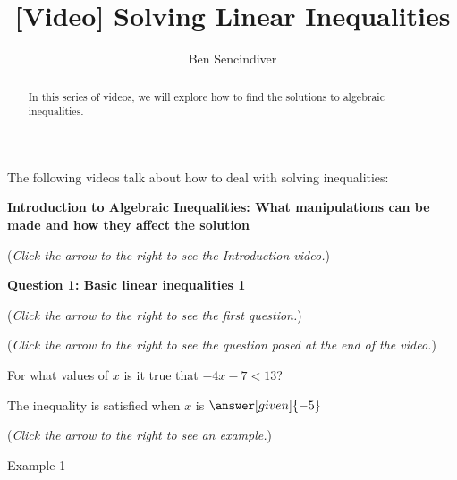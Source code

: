 \documentclass{ximera}
\title[Prerequisite Videos: ]{[Video] Solving Linear Inequalities}
\author{Ben Sencindiver}
\begin{document}
\begin{abstract}
  In this series of videos, we will explore how to find the solutions
  to algebraic inequalities. 
\end{abstract}
\maketitle

The following videos talk about how to deal with solving inequalities:


\textbf{Introduction to Algebraic Inequalities: What manipulations
can
be made and how they affect the solution}
\begin{flushright}
{\color{blue}(\emph{Click the arrow to the right to see the Introduction video.})}
\end{flushright}
\begin{center}
\begin{expandable}
\end{expandable}
\end{center}





\textbf{Question 1: Basic linear inequalities 1}
\begin{question}
\begin{flushright}
{\color{blue}(\emph{Click the arrow to the right to see the first question.})}
\end{flushright}
\begin{center}
\begin{expandable}
{\color{blue}(\emph{Click the arrow to the right to see the question
posed at the end of the video.})}
\begin{expandable}
For what values of $x$ is it true that $-4x-7 <13$?\\

\begin{prompt}
The inequality is satisfied when $x$ is  $\answer[given]{-5}$\\


\end{prompt}
\begin{flushright}
{\color{blue}(\emph{Click the arrow to the right to see an example.})}
\end{flushright}
\begin{expandable}
Example 1
\end{expandable}
\end{expandable}
\end{expandable}
\end{center}
\end{question}
\end{document}
